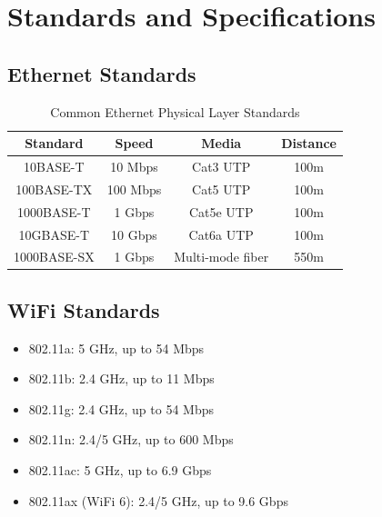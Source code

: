 \newpage
\section*{Standards and Specifications}
\subsection*{Ethernet Standards}
\begin{table}[h]
    \centering
    \begin{tabular}{|c|c|c|c|}
        \hline
        \textbf{Standard} & \textbf{Speed} & \textbf{Media} & \textbf{Distance} \\
        \hline
        10BASE-T & 10 Mbps & Cat3 UTP & 100m \\
        100BASE-TX & 100 Mbps & Cat5 UTP & 100m \\
        1000BASE-T & 1 Gbps & Cat5e UTP & 100m \\
        10GBASE-T & 10 Gbps & Cat6a UTP & 100m \\
        1000BASE-SX & 1 Gbps & Multi-mode fiber & 550m \\
        \hline
    \end{tabular}
    \caption{Common Ethernet Physical Layer Standards}\label{tab:ethernet_standards}
\end{table}

\subsection*{WiFi Standards}
\begin{itemize}
    \item 802.11a: 5 GHz, up to 54 Mbps
    \item 802.11b: 2.4 GHz, up to 11 Mbps
    \item 802.11g: 2.4 GHz, up to 54 Mbps
    \item 802.11n: 2.4/5 GHz, up to 600 Mbps
    \item 802.11ac: 5 GHz, up to 6.9 Gbps
    \item 802.11ax (WiFi 6): 2.4/5 GHz, up to 9.6 Gbps
\end{itemize}
